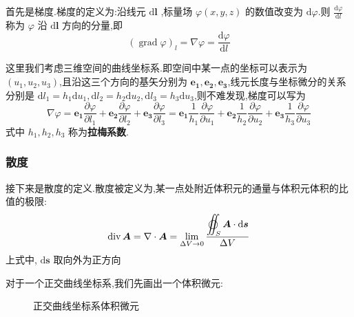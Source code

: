 \documentclass[UTF8]{ctexbook}
\newcommand{\D}{\text{d}}
\newcommand{\grad}{\operatorname{grad}}
\newcommand{\divergence}{\operatorname{div}}
\newcommand{\derivative}[2]{\frac{\D #1}{\D #2}}
\newcommand{\pd}[2]{\frac{\partial #1}{\partial #2}}
\begin{document}
\begin{definition}
    首先是梯度.梯度的定义为:沿线元 $\D \boldsymbol{l}$ ,标量场 $\varphi(x,y,z)$ 的数值改变为 $\D \varphi$.则 $\derivative{\varphi}{l}$ 称为 $\varphi$ 沿 $\D \boldsymbol{l}$ 方向的分量,即
    \[(\grad \varphi)_l = \nabla \varphi = \derivative{\varphi}{l}\]
\end{definition}

这里我们考虑三维空间的曲线坐标系.即空间中某一点的坐标可以表示为 $(u_1,u_2,u_3)$,且沿这三个方向的基矢分别为 $\boldsymbol{e_1},\boldsymbol{e_2},\boldsymbol{e_3}$,线元长度与坐标微分的关系分别是 $\D l_1=h_1\D u_1,\D l_2=h_2\D u_2,\D l_3=h_3\D u_3$,则不难发现,梯度可以写为
\begin{equation}
    \nabla \varphi = \boldsymbol{e_1} \pd{\varphi}{l_1} + \boldsymbol{e_2} \pd{\varphi}{l_2} + \boldsymbol{e_3} \pd{\varphi}{l_3} = \boldsymbol{e_1} \frac{1}{h_1} \pd{\varphi}{u_1} + \boldsymbol{e_2} \frac{1}{h_2} \pd{\varphi}{u_2} + \boldsymbol{e_3} \frac{1}{h_3} \pd{\varphi}{u_3}
\end{equation}
式中 $h_1,h_2,h_3$ 称为\textbf{拉梅系数}.

\subsubsection{散度}

\begin{definition}
    接下来是散度的定义.散度被定义为,某一点处附近体积元的通量与体积元体积的比值的极限:
    \[\divergence \boldsymbol{A}=\nabla \cdot \boldsymbol{A} = \lim_{\Delta V\to 0} \frac{\displaystyle \varoiint_S \boldsymbol{A} \cdot \D \boldsymbol{s}}{\Delta V}\]
    上式中, $\D \boldsymbol{s}$ 取向外为正方向
\end{definition}

对于一个正交曲线坐标系,我们先画出一个体积微元:

\begin{figure}[htbp]
    \centering
    \caption{正交曲线坐标系体积微元}
\end{figure}
\end{document}
